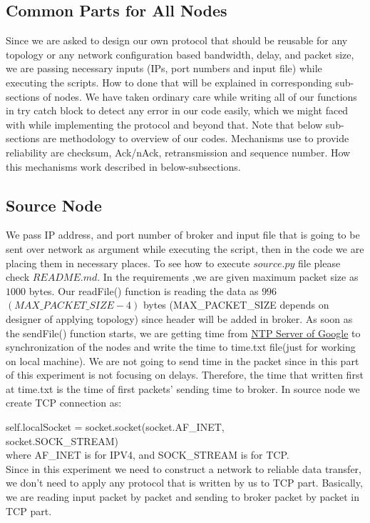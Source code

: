 \subsection{Common Parts for All Nodes}
Since we are asked to design our own protocol that should be reusable for any topology or any network configuration based bandwidth, delay, and packet size, we are passing necessary inputs (IPs, port numbers and input file) while executing the scripts. How to done that will be explained in corresponding sub-sections of nodes. We have taken ordinary care while writing all of our functions in try catch block to detect any error in our code easily, which we might faced with while implementing the protocol and beyond that. Note that below sub-sections are methodology to overview of our codes. Mechanisms use to provide reliability are checksum, Ack/nAck, retransmission and sequence number. How this mechanisms work described in below-subsections. 
\newpage
\subsection{Source Node}
We pass IP address, and port number of broker and input file that is going to be sent over network as argument while executing the script, then in the code we are placing them in necessary places. To see how to execute $source.py$ file please check $README.md$.
In the requirements ,we are given maximum packet size as $1000$  bytes. Our readFile() function is reading the data as $996$ $(MAX\_PACKET\_SIZE - 4)$ bytes (MAX\_PACKET\_SIZE depends on designer of applying topology) since header will be added in broker. As soon as the sendFile() function starts, we are getting time from \href{https://developers.google.com/time/}{NTP Server of Google} to synchronization of the nodes and write the time to time.txt file(just for working on local machine). We are not going to send time in the packet since in this part of this experiment is not focusing on delays. Therefore, the time that written first at time.txt is the time of first packets' sending time to broker. In source node we create TCP connection as: 

self.localSocket = socket.socket(socket.AF\_INET,\\
socket.SOCK\_STREAM)\\
where AF\_INET is for IPV4, and SOCK\_STREAM is for TCP. \\
Since in this experiment we need to construct a network to reliable data transfer, we don't need to apply any protocol that is written by us to TCP part. Basically, we are reading input packet by packet and sending to broker packet by packet in TCP part.\\
